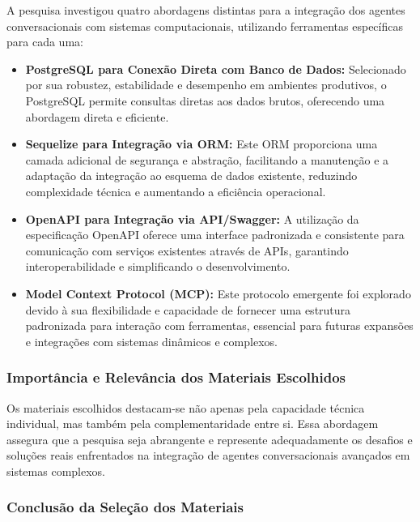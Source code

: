 \documentclass[
]{article}
\begin{document}
A pesquisa investigou quatro abordagens distintas para a integração dos
agentes conversacionais com sistemas computacionais, utilizando
ferramentas específicas para cada uma:

\begin{itemize}
\item
  \textbf{PostgreSQL para Conexão Direta com Banco de Dados:}
  Selecionado por sua robustez, estabilidade e desempenho em ambientes
  produtivos, o PostgreSQL permite consultas diretas aos dados brutos,
  oferecendo uma abordagem direta e eficiente.
\item
  \textbf{Sequelize para Integração via ORM:} Este ORM proporciona uma
  camada adicional de segurança e abstração, facilitando a manutenção e
  a adaptação da integração ao esquema de dados existente, reduzindo
  complexidade técnica e aumentando a eficiência operacional.
\item
  \textbf{OpenAPI para Integração via API/Swagger:} A utilização da
  especificação OpenAPI oferece uma interface padronizada e consistente
  para comunicação com serviços existentes através de APIs, garantindo
  interoperabilidade e simplificando o desenvolvimento.
\item
  \textbf{Model Context Protocol (MCP):} Este protocolo emergente foi
  explorado devido à sua flexibilidade e capacidade de fornecer uma
  estrutura padronizada para interação com ferramentas, essencial para
  futuras expansões e integrações com sistemas dinâmicos e complexos.
\end{itemize}

\subsubsection{Importância e Relevância dos Materiais
Escolhidos}\label{importuxe2ncia-e-relevuxe2ncia-dos-materiais-escolhidos}

Os materiais escolhidos destacam-se não apenas pela capacidade técnica
individual, mas também pela complementaridade entre si. Essa abordagem
assegura que a pesquisa seja abrangente e represente adequadamente os
desafios e soluções reais enfrentados na integração de agentes
conversacionais avançados em sistemas complexos.

\subsubsection{Conclusão da Seleção dos
Materiais}\label{conclusuxe3o-da-seleuxe7uxe3o-dos-materiais}
\end{document}
